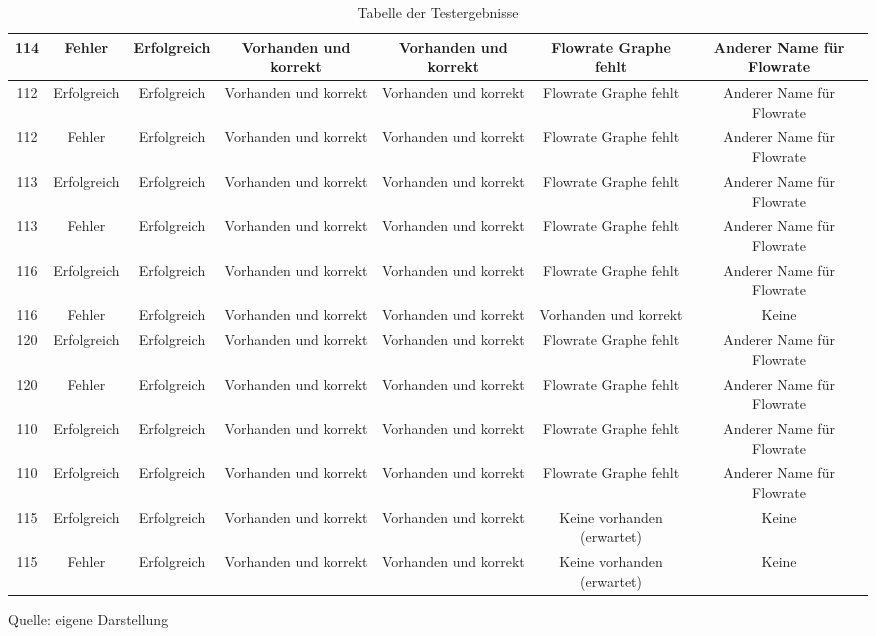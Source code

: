 \begin{table}[H]
{\begin{tabular}{|c|c|c|c|c|c|c|}
        \hline
        \rowcolor{yellow!15}
        114 & Fehler & Erfolgreich & Vorhanden und korrekt & Vorhanden und korrekt & Flowrate Graphe fehlt & Anderer Name für Flowrate \\
        \hline
        \rowcolor{yellow!15}
        112 & Erfolgreich & Erfolgreich & Vorhanden und korrekt & Vorhanden und korrekt & Flowrate Graphe fehlt & Anderer Name für Flowrate \\
        \hline
        \rowcolor{yellow!15}
        112 & Fehler & Erfolgreich & Vorhanden und korrekt & Vorhanden und korrekt & Flowrate Graphe fehlt & Anderer Name für Flowrate \\
        \hline
        \rowcolor{yellow!15}
        113 & Erfolgreich & Erfolgreich & Vorhanden und korrekt & Vorhanden und korrekt & Flowrate Graphe fehlt & Anderer Name für Flowrate \\
        \hline
        \rowcolor{yellow!15}
        113 & Fehler & Erfolgreich & Vorhanden und korrekt & Vorhanden und korrekt & Flowrate Graphe fehlt & Anderer Name für Flowrate \\
        \hline
        \rowcolor{yellow!15}
        116 & Erfolgreich & Erfolgreich & Vorhanden und korrekt & Vorhanden und korrekt & Flowrate Graphe fehlt & Anderer Name für Flowrate \\
        \hline
        \rowcolor{green!15}
        116 & Fehler & Erfolgreich & Vorhanden und korrekt & Vorhanden und korrekt & Vorhanden und korrekt & Keine \\
        \hline
        \rowcolor{yellow!15}
        120 & Erfolgreich & Erfolgreich & Vorhanden und korrekt & Vorhanden und korrekt & Flowrate Graphe fehlt & Anderer Name für Flowrate \\
        \hline
        \rowcolor{yellow!15}
        120 & Fehler & Erfolgreich & Vorhanden und korrekt & Vorhanden und korrekt & Flowrate Graphe fehlt & Anderer Name für Flowrate \\
        \hline
        \rowcolor{yellow!15}
        110 & Erfolgreich & Erfolgreich & Vorhanden und korrekt & Vorhanden und korrekt & Flowrate Graphe fehlt & Anderer Name für Flowrate \\
        \hline
        \rowcolor{yellow!15}
        110 & Erfolgreich & Erfolgreich & Vorhanden und korrekt & Vorhanden und korrekt & Flowrate Graphe fehlt & Anderer Name für Flowrate \\
        \hline
        \rowcolor{green!15}
        115 & Erfolgreich & Erfolgreich & Vorhanden und korrekt & Vorhanden und korrekt & Keine vorhanden (erwartet) & Keine \\
        \hline
        \rowcolor{green!15}
        115 & Fehler & Erfolgreich & Vorhanden und korrekt & Vorhanden und korrekt & Keine vorhanden (erwartet) & Keine \\
        \hline
    \end{tabular}
    } %
    \caption{Tabelle der Testergebnisse}
    \label{tab: Tabelle der Testergebnisse}
    \vspace{0.2cm}
    {Quelle: eigene Darstellung}
\end{table}


